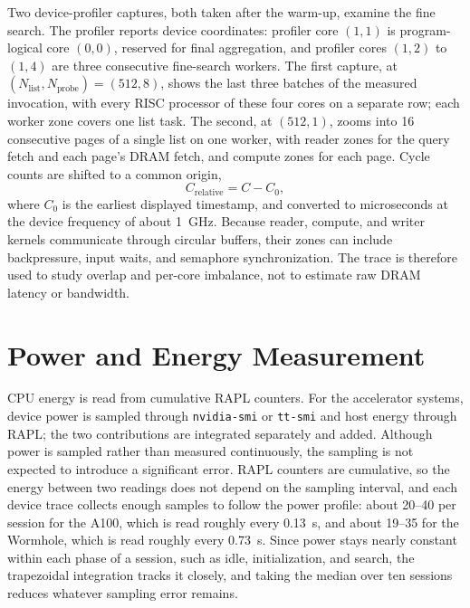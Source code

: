 Two device-profiler captures, both taken after the warm-up, examine the fine
search. The profiler reports device coordinates: profiler core \((1,1)\) is
program-logical core \((0,0)\), reserved for final aggregation, and profiler
cores \((1,2)\) to \((1,4)\) are three consecutive fine-search workers. The
first capture, at \((N_{\mathrm{list}},N_{\mathrm{probe}})=(512,8)\), shows
the last three batches of the measured invocation, with every RISC processor
of these four cores on a separate row; each worker zone covers one list task. The second, at \((512,1)\), zooms into 16 consecutive
pages of a single list on one worker, with reader zones for the query fetch
and each page's DRAM fetch, and compute zones for each page. Cycle counts are
shifted to a common origin,
\begin{equation}
C_{\mathrm{relative}}=C-C_0,
\label{eq:relative-device-cycles}
\end{equation}
where \(C_0\) is the earliest displayed timestamp, and converted to
microseconds at the device frequency of about 1~GHz.
Because reader, compute, and writer kernels communicate through circular
buffers, their zones can include backpressure, input waits, and semaphore
synchronization. The trace is therefore used to study overlap and per-core
imbalance, not to estimate raw DRAM latency or bandwidth.

\section{Power and Energy Measurement}
\label{sec:power-energy-method}

CPU energy is read from cumulative RAPL counters. For the accelerator systems,
device power is sampled through \texttt{nvidia-smi} or \texttt{tt-smi} and
host energy through RAPL; the two contributions are integrated separately and
added. Although power is sampled rather than measured continuously, the
sampling is not expected to introduce a significant error. RAPL counters are
cumulative, so the energy between two readings does not depend on the
sampling interval, and each device trace collects enough samples to follow
the power profile: about 20--40 per session for the A100, which is read
roughly every 0.13~s, and about 19--35 for the Wormhole, which is read roughly
every 0.73~s. Since power stays nearly constant within each phase of a
session, such as idle, initialization, and search, the trapezoidal
integration tracks it closely, and taking the median over ten sessions
reduces whatever sampling error remains.

